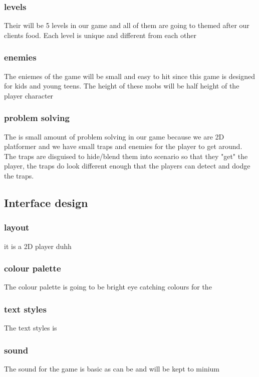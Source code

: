 \documentclass{article}
\begin{document}
\subsubsection{levels}
Their will be 5 levels in our game and all of them are going to themed after our clients food. Each level is unique and different from each other 

\subsubsection{enemies}
The eniemes of the game will be small and easy to hit since this game is designed for kids and young teens. The height of these mobs will be half height of the player character 


\subsubsection{problem solving}
The is small amount of problem solving in our game because we are 2D platformer and we have small traps and enemies for the player to get around. The traps are disguised to hide/blend them into scenario so that they "get" the player, the traps do look different enough that the players can detect and dodge the traps.

\subsection{Interface design}
\subsubsection{layout}
it is a 2D player duhh

\subsubsection{colour palette}
The colour palette is going to be bright eye catching colours for the  

\subsubsection{text styles}
The text styles is 

\subsubsection{sound}
The sound for the game is basic as can be and will be kept to minium
\end{document}

